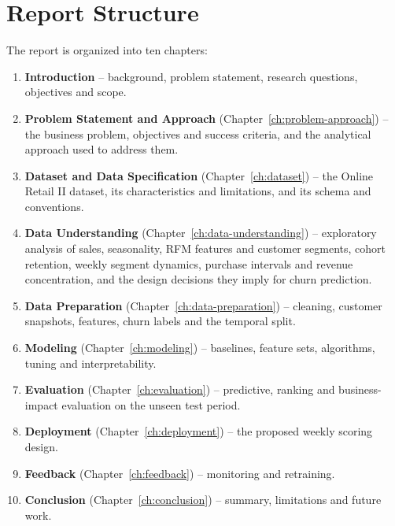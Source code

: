 \section{Report Structure}
\label{sec:1-6}

The report is organized into ten chapters:

\begin{enumerate}
    \item \textbf{Introduction} -- background, problem statement, research questions, objectives and scope.
    \item \textbf{Problem Statement and Approach} (Chapter~\ref{ch:problem-approach}) -- the business problem, objectives and success criteria, and the analytical approach used to address them.
    \item \textbf{Dataset and Data Specification} (Chapter~\ref{ch:dataset}) -- the Online Retail II dataset, its characteristics and limitations, and its schema and conventions.
    \item \textbf{Data Understanding} (Chapter~\ref{ch:data-understanding}) -- exploratory analysis of sales, seasonality, RFM features and customer segments, cohort retention, weekly segment dynamics, purchase intervals and revenue concentration, and the design decisions they imply for churn prediction.
    \item \textbf{Data Preparation} (Chapter~\ref{ch:data-preparation}) -- cleaning, customer snapshots, features, churn labels and the temporal split.
    \item \textbf{Modeling} (Chapter~\ref{ch:modeling}) -- baselines, feature sets, algorithms, tuning and interpretability.
    \item \textbf{Evaluation} (Chapter~\ref{ch:evaluation}) -- predictive, ranking and business-impact evaluation on the unseen test period.
    \item \textbf{Deployment} (Chapter~\ref{ch:deployment}) -- the proposed weekly scoring design.
    \item \textbf{Feedback} (Chapter~\ref{ch:feedback}) -- monitoring and retraining.
    \item \textbf{Conclusion} (Chapter~\ref{ch:conclusion}) -- summary, limitations and future work.
\end{enumerate}
